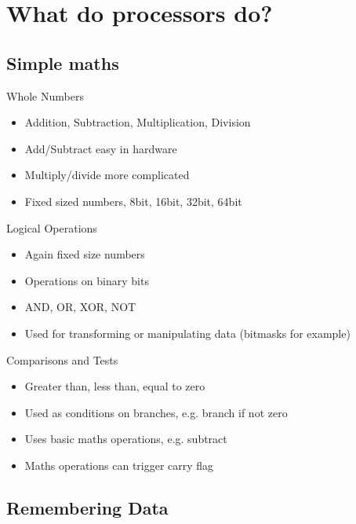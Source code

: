 \documentclass{beamer}
\begin{document}
\section{What do processors do?}

\subsection[Maths]{Simple maths}

\begin{frame}{Whole Numbers}
  \begin{itemize}
  \item
    Addition, Subtraction, Multiplication, Division
  \item
    Add/Subtract easy in hardware
  \item
    Multiply/divide more complicated
  \item
    Fixed sized numbers, 8bit, 16bit, 32bit, 64bit
  \end{itemize}
\end{frame}

\begin{frame}{Logical Operations}
  \begin{itemize}
  \item
    Again fixed size numbers
  \item
    Operations on binary bits
  \item
    AND, OR, XOR, NOT
  \item
    Used for transforming or manipulating data (bitmasks for example)
  \end{itemize}
\end{frame}

\begin{frame}{Comparisons and Tests}
  \begin{itemize}
  \item
    Greater than, less than, equal to zero
  \item
    Used as conditions on branches, e.g. branch if not zero
  \item
    Uses basic maths operations, e.g. subtract
  \item
    Maths operations can trigger carry flag
  \end{itemize}
\end{frame}


\subsection[Memory]{Remembering Data}
\end{document}
